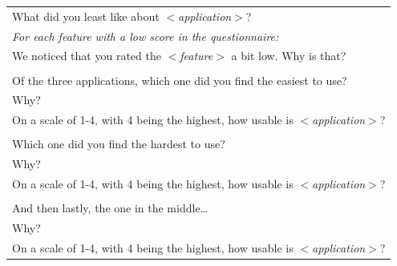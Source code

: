 \begin{longtable}{|p{13cm}|}
		  	What did you least like about \textit{$<$application$>$}? \\ 
		  	\textit{For each feature with a low score in the questionnaire:} \\ 
		  	\hspace{6mm}We noticed that you rated the \textit{$<$feature$>$} a bit low. Why is that? \\ 
		  	\\
			Of the three applications, which one did you find the easiest to use? \\ 
			Why? \\ 
			On a scale of 1-4, with 4 being the highest, how usable is \textit{$<$application$>$}? \\ 
			\\
			Which one did you find the hardest to use? \\ 
			Why? \\ 
			On a scale of 1-4, with 4 being the highest, how usable is \textit{$<$application$>$}? \\
			\\
			And then lastly, the one in the middle\ldots \\ 
			Why? \\ 
			On a scale of 1-4, with 4 being the highest, how usable is \textit{$<$application$>$}? \\ \hline
		\end{longtable}

